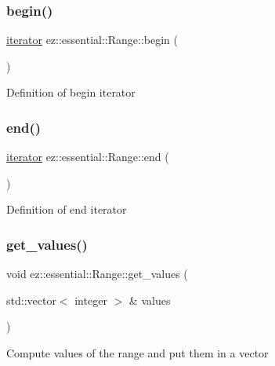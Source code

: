 \subsubsection{\texorpdfstring{begin()}{begin()}}
{\footnotesize\ttfamily \hyperlink{classez_1_1essential_1_1Range_1_1iterator}{iterator} ez\+::essential\+::\+Range\+::begin (\begin{DoxyParamCaption}{ }\end{DoxyParamCaption})\hspace{0.3cm}{\ttfamily [inline]}}

Definition of begin iterator \mbox{\label{classez_1_1essential_1_1Range_a4342f09c49f0c17667f07602c930349d}} 
\subsubsection{\texorpdfstring{end()}{end()}}
{\footnotesize\ttfamily \hyperlink{classez_1_1essential_1_1Range_1_1iterator}{iterator} ez\+::essential\+::\+Range\+::end (\begin{DoxyParamCaption}{ }\end{DoxyParamCaption})\hspace{0.3cm}{\ttfamily [inline]}}

Definition of end iterator \mbox{\label{classez_1_1essential_1_1Range_a257728a7783528ffa35b5f8158db90ec}} 
\subsubsection{\texorpdfstring{get\+\_\+values()}{get\_values()}}
{\footnotesize\ttfamily void ez\+::essential\+::\+Range\+::get\+\_\+values (\begin{DoxyParamCaption}\item[{std\+::vector$<$ integer $>$ \&}]{values }\end{DoxyParamCaption})\hspace{0.3cm}{\ttfamily [inline]}}

Compute values of the range and put them in a vector \mbox{\label{classez_1_1essential_1_1Range_a63321b30a6d5d626de3653218c278847}} 
